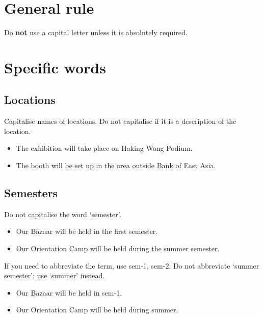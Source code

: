 \documentclass[11pt,a4paper]{book}
\newcommand{\cmark}{{\color{green(html/cssgreen)}\checkmark}}%
\begin{document}
		\section{General rule}
		Do \textbf{not} use a capital letter unless it is absolutely required.
		\section{Specific words}
			\subsection{Locations}
			Capitalise names of locations. Do not capitalise if it is a description of the location.
				{\firasans \begin{mdframed}[backgroundcolor=aliceblue] \begin{itemize}[label=\cmark]
					\item The exhibition will take place on Haking Wong Podium.
					\item The booth will be set up in the area outside Bank of East Asia.
				\end{itemize} \end{mdframed} }
			\subsection{Semesters}
				Do not capitalise the word `semester'.
				{\firasans \begin{mdframed}[backgroundcolor=aliceblue] \begin{itemize}[label=\cmark]
					\item Our Bazaar will be held in the first semester.
					\item 
					Our Orientation Camp will be held during the summer semester.
				\end{itemize} \end{mdframed} }
				If you need to abbreviate the term, use sem-1, sem-2. Do not abbreviate `summer semester'; use `summer' instead.
				{\firasans \begin{mdframed}[backgroundcolor=aliceblue] \begin{itemize}[label=\cmark]
					\item Our Bazaar will be held in sem-1.
					\item Our Orientation Camp will be held during summer.
				\end{itemize} \end{mdframed} }
\end{document}
